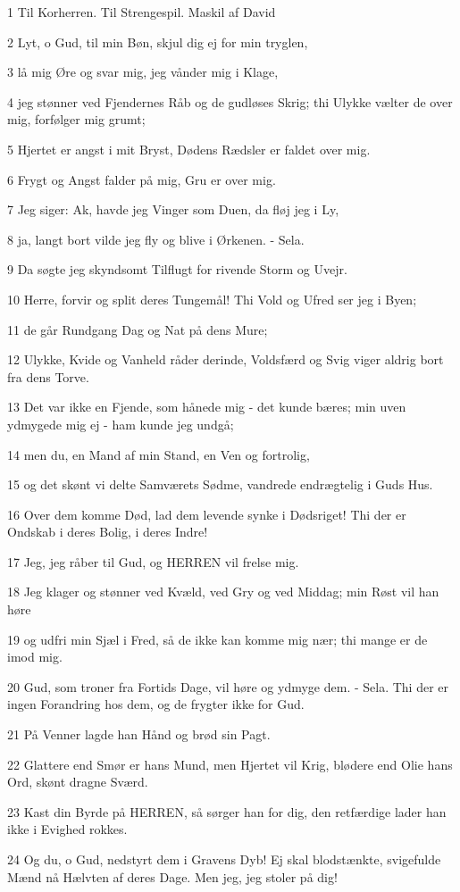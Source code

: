 \par 1 Til Korherren. Til Strengespil. Maskil af David
\par 2 Lyt, o Gud, til min Bøn, skjul dig ej for min tryglen,
\par 3 lå mig Øre og svar mig, jeg vånder mig i Klage,
\par 4 jeg stønner ved Fjendernes Råb og de gudløses Skrig; thi Ulykke vælter de over mig, forfølger mig grumt;
\par 5 Hjertet er angst i mit Bryst, Dødens Rædsler er faldet over mig.
\par 6 Frygt og Angst falder på mig, Gru er over mig.
\par 7 Jeg siger: Ak, havde jeg Vinger som Duen, da fløj jeg i Ly,
\par 8 ja, langt bort vilde jeg fly og blive i Ørkenen. - Sela.
\par 9 Da søgte jeg skyndsomt Tilflugt for rivende Storm og Uvejr.
\par 10 Herre, forvir og split deres Tungemål! Thi Vold og Ufred ser jeg i Byen;
\par 11 de går Rundgang Dag og Nat på dens Mure;
\par 12 Ulykke, Kvide og Vanheld råder derinde, Voldsfærd og Svig viger aldrig bort fra dens Torve.
\par 13 Det var ikke en Fjende, som hånede mig - det kunde bæres; min uven ydmygede mig ej - ham kunde jeg undgå;
\par 14 men du, en Mand af min Stand, en Ven og fortrolig,
\par 15 og det skønt vi delte Samværets Sødme, vandrede endrægtelig i Guds Hus.
\par 16 Over dem komme Død, lad dem levende synke i Dødsriget! Thi der er Ondskab i deres Bolig, i deres Indre!
\par 17 Jeg, jeg råber til Gud, og HERREN vil frelse mig.
\par 18 Jeg klager og stønner ved Kvæld, ved Gry og ved Middag; min Røst vil han høre
\par 19 og udfri min Sjæl i Fred, så de ikke kan komme mig nær; thi mange er de imod mig.
\par 20 Gud, som troner fra Fortids Dage, vil høre og ydmyge dem. - Sela. Thi der er ingen Forandring hos dem, og de frygter ikke for Gud.
\par 21 På Venner lagde han Hånd og brød sin Pagt.
\par 22 Glattere end Smør er hans Mund, men Hjertet vil Krig, blødere end Olie hans Ord, skønt dragne Sværd.
\par 23 Kast din Byrde på HERREN, så sørger han for dig, den retfærdige lader han ikke i Evighed rokkes.
\par 24 Og du, o Gud, nedstyrt dem i Gravens Dyb! Ej skal blodstænkte, svigefulde Mænd nå Hælvten af deres Dage. Men jeg, jeg stoler på dig!

